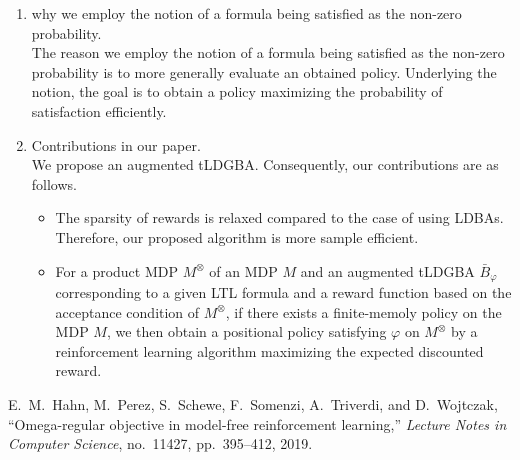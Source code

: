 \documentclass[10 pt, dvipdfmx]{article}
\theoremstyle{definition}
\begin{document}
\begin{enumerate}
  \item why we employ the notion of a formula being satisfied as the non-zero probability. \\
  The reason we employ the notion of a formula being satisfied as the non-zero probability is to more generally evaluate an obtained policy. Underlying the notion, the goal is to obtain a policy maximizing the probability of satisfaction efficiently.

  \item Contributions in our paper. \\
  We propose an augmented tLDGBA. Consequently, our contributions are as follows.
  \begin{itemize}
    \item  The sparsity of rewards is relaxed compared to the case of using LDBAs. Therefore, our proposed algorithm is more sample efficient.

    \item For a product MDP $M^{\otimes}$ of an MDP $M$ and an augmented tLDGBA $\bar{B}_{\varphi}$ corresponding to a given LTL formula and a reward function based on the acceptance condition of $M^{\otimes}$, if there exists a finite-memoly policy on the MDP $M$, we then obtain a positional policy satisfying $\varphi$ on $M^{\otimes}$ by a reinforcement learning algorithm maximizing the expected discounted reward.

  \end{itemize}
\end{enumerate}

\begin{thebibliography}{99}
E.\ M.\ Hahn, M.\ Perez, S.\ Schewe, F.\ Somenzi, A.\ Triverdi, and D.\ Wojtczak,
``Omega-regular objective in model-free reinforcement learning,''
\textit{Lecture Notes in Computer Science}, no.\ 11427, pp.\ 395--412, 2019.
\end{thebibliography}
\end{document}

